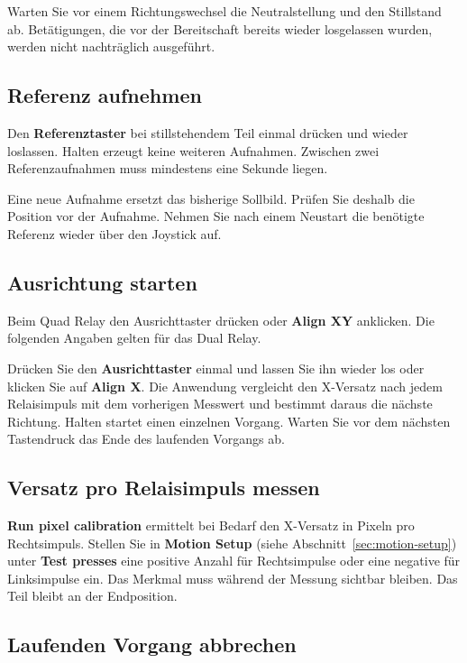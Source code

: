\documentclass[a4paper,11pt]{article}
\newcommand{\Referenz}{\textbf{Referenztaster}}
\newcommand{\Ausrichten}{\textbf{Ausrichttaster}}
\begin{document}
Warten Sie vor einem Richtungswechsel die Neutralstellung und den Stillstand
ab. Betätigungen, die vor der Bereitschaft bereits wieder losgelassen wurden,
werden nicht nachträglich ausgeführt.

\subsection{Referenz aufnehmen}

Den \Referenz{} bei stillstehendem Teil einmal drücken und wieder loslassen.
Halten erzeugt keine weiteren Aufnahmen. Zwischen zwei Referenzaufnahmen muss
mindestens eine Sekunde liegen.

Eine neue Aufnahme ersetzt das bisherige Sollbild. Prüfen Sie deshalb die
Position vor der Aufnahme. Nehmen Sie nach einem Neustart die benötigte
Referenz wieder über den Joystick auf.

\subsection{Ausrichtung starten}

Beim Quad Relay den Ausrichttaster drücken oder \textbf{Align XY} anklicken. Die folgenden Angaben gelten für das Dual Relay.

Drücken Sie den \Ausrichten{} einmal und lassen Sie ihn wieder los oder
klicken Sie auf \textbf{Align X}. Die Anwendung vergleicht den X-Versatz nach
jedem Relaisimpuls mit dem vorherigen Messwert und bestimmt daraus die
nächste Richtung. Halten startet einen einzelnen Vorgang. Warten Sie vor dem
nächsten Tastendruck das Ende des laufenden Vorgangs ab.

\subsection{Versatz pro Relaisimpuls messen}

\textbf{Run pixel calibration} ermittelt bei Bedarf den X-Versatz in Pixeln
pro Rechtsimpuls. Stellen Sie in \textbf{Motion Setup} (siehe Abschnitt~\ref{sec:motion-setup})
unter \textbf{Test presses}
eine positive Anzahl für Rechtsimpulse oder eine negative für Linksimpulse ein.
Das Merkmal muss während der Messung sichtbar bleiben. Das Teil bleibt an der
Endposition.

\subsection{Laufenden Vorgang abbrechen}
\end{document}
